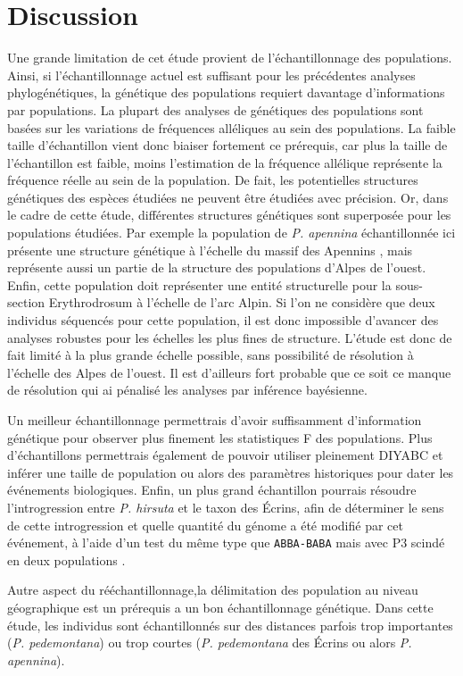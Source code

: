 \section{Discussion}



Une grande limitation de cet étude provient de l'échantillonnage des populations.
 Ainsi, si l'échantillonnage actuel est suffisant pour les précédentes analyses phylogénétiques, la génétique des populations requiert davantage d'informations par populations.
 La plupart des analyses de génétiques des populations sont basées sur les variations de fréquences alléliques au sein des populations.
 La faible taille d'échantillon vient donc biaiser fortement ce prérequis, car plus la taille de l'échantillon est faible, moins l'estimation de la fréquence allélique représente la fréquence réelle au sein de la population.
 De fait, les potentielles structures génétiques des espèces étudiées ne peuvent être étudiées avec précision.
 Or, dans le cadre de cette étude, différentes structures génétiques sont superposée pour les populations étudiées.
 Par exemple la population de \textit{P. apennina} échantillonnée ici présente une structure génétique à l'échelle du massif des Apennins \citep{Crema2009}, mais représente aussi un partie de la structure des populations d'Alpes de l'ouest.
 Enfin, cette population doit représenter une entité structurelle pour la sous-section Erythrodrosum à l'échelle de l'arc Alpin.
 Si l'on ne considère que deux individus séquencés pour cette population, il est donc impossible d'avancer des analyses robustes pour les échelles les plus fines de structure.
 L'étude est donc de fait limité à la plus grande échelle possible, sans possibilité de résolution à l'échelle des Alpes de l'ouest.
 Il est d'ailleurs fort probable que ce soit ce manque de résolution qui ai pénalisé les analyses par inférence bayésienne.


Un meilleur échantillonnage permettrais d'avoir suffisamment d'information génétique pour observer plus finement les statistiques F des populations.
 Plus d'échantillons permettrais également de pouvoir utiliser pleinement DIYABC et inférer une taille de population ou alors des paramètres historiques pour dater les événements biologiques.
 Enfin, un plus grand échantillon pourrais résoudre l'introgression entre \textit{P. hirsuta} et le taxon des Écrins, afin de déterminer le sens de cette introgression et quelle quantité du génome a été modifié par cet événement, à l'aide d'un test du même type que \verb|ABBA-BABA| mais avec P3 scindé en deux populations \citep{Eaton2015}. 

Autre aspect du rééchantillonnage,la délimitation des population au niveau géographique est un prérequis a un bon échantillonnage génétique.
 Dans cette étude, les individus sont échantillonnés sur des distances parfois trop importantes (\textit{P. pedemontana}) ou trop courtes (\textit{P. pedemontana} des Écrins ou alors \textit{P. apennina}).

